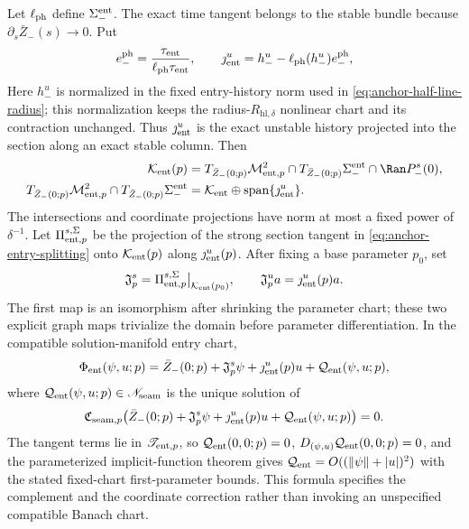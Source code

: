 \begin{lemma}
Let \(\ell_{\rm ph}\) define \(\Sigma_-^{\rm ent}\).  The exact time
tangent belongs to the stable bundle because
\(\partial_s\bar Z_-(s)\to0\).  Put
\begin{equation}
 e_-^{\rm ph}
 =\frac{\tau_{\rm ent}}
        {\ell_{\rm ph}\tau_{\rm ent}},
 \qquad
 \jmath_{\rm ent}^u
 =h_-^u-\ell_{\rm ph}(h_-^u)e_-^{\rm ph},             \label{eq:anchor-exact-phase-projected-column}
\end{equation}
Here \(h_-^u\) is normalized in the fixed entry-history norm used in
\cref{eq:anchor-half-line-radius}; this normalization keeps the
radius-\(R_{\mathrm{hl},\delta}\) nonlinear chart and its contraction
unchanged.  Thus
\(\jmath_{\rm ent}^u\) is the exact unstable
history projected into the section along an exact stable column.  Then
\begin{equation}
 \begin{aligned}
 \mathcal K_{\rm ent}(p)
 &=T_{\bar Z_-(0;p)}\mathcal M_{{\rm ent},p}^2
   \cap T_{\bar Z_-(0;p)}\Sigma_-^{\rm ent}
   \cap\Ran P_-^s(0),\\
 T_{\bar Z_-(0;p)}\mathcal M_{{\rm ent},p}^2
   \cap T_{\bar Z_-(0;p)}\Sigma_-^{\rm ent}
 &=\mathcal K_{\rm ent}\oplus
       \operatorname{span}\{\jmath_{\rm ent}^u\}.
 \end{aligned}                                         \label{eq:anchor-entry-splitting}
\end{equation}
The intersections and coordinate projections have norm at most a fixed
power of \(\delta^{-1}\).  Let
\(\Pi_{{\rm ent},p}^{s,\Sigma}\) be the projection of the strong section
tangent in \cref{eq:anchor-entry-splitting} onto \(\mathcal K_{\rm ent}(p)\)
along \(\jmath_{\rm ent}^u(p)\).  After fixing a base parameter \(p_0\), set
\begin{equation}
 \mathfrak J_p^s
 =\Pi_{{\rm ent},p}^{s,\Sigma}\big|_{\mathcal K_{\rm ent}(p_0)},
 \qquad
 \mathfrak J_p^u a=\jmath_{\rm ent}^u(p)a .           \label{eq:anchor-entry-fixed-trivialization}
\end{equation}
The first map is an isomorphism after shrinking the parameter chart; these
two explicit graph maps trivialize the domain before parameter
differentiation.  In the compatible solution-manifold entry chart,
\begin{equation}
 \Phi_{\rm ent}(\psi,u;p)
 =\bar Z_-(0;p)+\mathfrak J_p^s\psi
  +\jmath_{\rm ent}^u(p)u+\mathcal Q_{\rm ent}(\psi,u;p),
                                                               \label{eq:anchor-compatible-entry-chart}
\end{equation}
where \(\mathcal Q_{\rm ent}(\psi,u;p)\in\mathscr N_{\rm seam}\) is the
unique solution of
\[
 \mathfrak C_{{\rm seam},p}
   \bigl(\bar Z_-(0;p)+\mathfrak J_p^s\psi
       +\jmath_{\rm ent}^u(p)u+\mathcal Q_{\rm ent}(\psi,u;p)\bigr)=0.
\]
The tangent terms lie in \(\mathscr T_{{\rm ent},p}\), so
\(\mathcal Q_{\rm ent}(0,0;p)=0\),
\(D_{(\psi,u)}\mathcal Q_{\rm ent}(0,0;p)=0\), and the parameterized
implicit-function theorem gives
\(\mathcal Q_{\rm ent}=O((\|\psi\|+|u|)^2)\) with the stated fixed-chart
first-parameter bounds.  This formula specifies the complement and the
coordinate correction rather than invoking an unspecified compatible
Banach chart.


\end{lemma}
